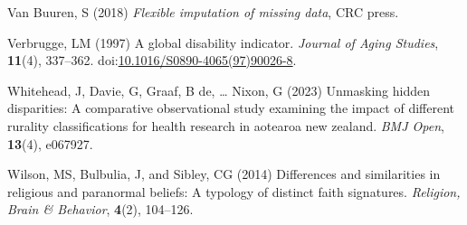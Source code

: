 \documentclass[
  single column]{article}
\newlength{\cslhangindent}
\newenvironment{CSLReferences}[2] %
 {\begin{list}{}{%
  \setlength{\itemindent}{0pt}
  \setlength{\leftmargin}{0pt}
  \setlength{\parsep}{0pt}
  \ifodd #1
   \setlength{\leftmargin}{\cslhangindent}
   \setlength{\itemindent}{-1\cslhangindent}
  \fi
  \setlength{\itemsep}{#2\baselineskip}}}
 {\end{list}}
\begin{document}
\begin{CSLReferences}{1}{0}
Van Buuren, S (2018) \emph{Flexible imputation of missing data}, CRC
press.

Verbrugge, LM (1997) A global disability indicator. \emph{Journal of
Aging Studies}, \textbf{11}(4), 337--362.
doi:\href{https://doi.org/10.1016/S0890-4065(97)90026-8}{10.1016/S0890-4065(97)90026-8}.

Whitehead, J, Davie, G, Graaf, B de, \ldots{} Nixon, G (2023) Unmasking
hidden disparities: A comparative observational study examining the
impact of different rurality classifications for health research in
aotearoa new zealand. \emph{BMJ Open}, \textbf{13}(4), e067927.

Wilson, MS, Bulbulia, J, and Sibley, CG (2014) Differences and
similarities in religious and paranormal beliefs: A typology of distinct
faith signatures. \emph{Religion, Brain \& Behavior}, \textbf{4}(2),
104--126.

\end{CSLReferences}
\end{document}
